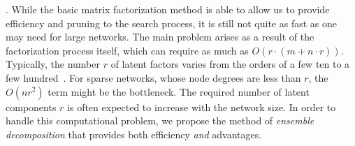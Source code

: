 . While the basic matrix factorization method is able to allow us to provide
efficiency and pruning to the search process, it is still not quite
as fast as one may need for large networks. The main problem
arises as a result of the factorization process itself, which can
require as much as $O(r \cdot (m + n\cdot r))$.  Typically, the
number $r$ of latent factors varies from the orders of a few ten to a few hundred~\cite{NMF-nature99, NMF-www2010}. For
sparse networks, whose node degrees are less than $r$, the $O(n
r^2)$ term might be the bottleneck.  The required  number of latent
components $r$ is often expected to increase with the network size. In
order to handle this computational problem, we propose the method of
{\em ensemble decomposition} that provides both efficiency {\em
and}  advantages.
